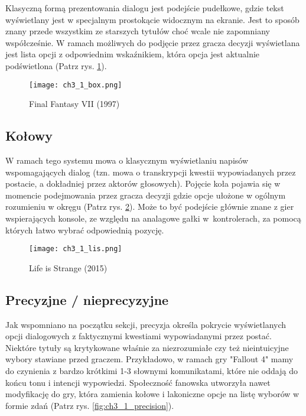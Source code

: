 Klasyczną formą prezentowania dialogu jest podejście pudełkowe, gdzie tekst wyświetlany jest w
specjalnym prostokącie widocznym na ekranie. Jest to sposób znany przede wszystkim ze starszych
tytułów choć wcale nie zapomniany współcześnie. W ramach możliwych do podjęcie przez gracza
decyzji wyświetlana jest lista opcji z odpowiednim wskaźnikiem, która opcja jest aktualnie
podświetlona (Patrz rys. \ref{fig:ch3_1_box}).

\begin{figure}[h]
    \texttt{[image: ch3\_1\_box.png]}
    \caption{Final Fantasy VII (1997)}
    \centering
    \label{fig:ch3_1_box}
\end{figure}

\newpage

\subsection{Kołowy}

W ramach tego systemu mowa o klasycznym wyświetlaniu napisów wspomagających dialog (tzn. mowa o
transkrypcji kwestii wypowiadanych przez postacie, a dokładniej przez aktorów głosowych). Pojęcie
koła pojawia się w momencie podejmowania przez gracza decyzji gdzie opcje ułożone w ogólnym
rozumieniu w okręgu (Patrz rys. \ref{fig:ch3_1_wheel}). Może to być podejście głównie znane
z gier wspierających konsole, ze względu na analagowe gałki w~kontrolerach, za pomocą których
łatwo wybrać odpowiednią pozycję.

\begin{figure}[h]
    \centering
    \texttt{[image: ch3\_1\_lis.png]}
    \caption{Life is Strange (2015)}
    \label{fig:ch3_1_wheel}
\end{figure}

\newpage

\subsection{Precyzjne / nieprecyzyjne}\label{subsubsection:ch3_1_precision}

Jak wspomniano na początku sekcji, precyzja określa pokrycie wyświetlanych opcji dialogowych z
faktycznymi kwestiami wypowiadanymi przez postać. Niektóre tytuły są krytykowane właśnie za
niezrozumiałe czy też nieintuicyjne wybory stawiane przed graczem. Przykładowo, w ramach gry
"Fallout 4" mamy do czynienia z bardzo krótkimi 1-3 słownymi komunikatami, które nie oddają
do końcu tonu i intencji wypowiedzi. Społeczność fanowska utworzyła nawet modyfikację do gry,
która zamienia kołowe i lakoniczne opcje na listę wyborów w formie zdań
(Patrz rys. \ref{fig:ch3_1_precision}).

